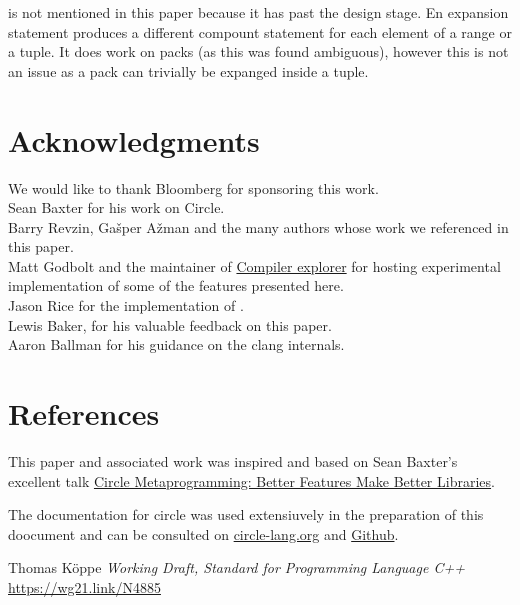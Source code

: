 \documentclass{wg21}
\begin{document}
 is not mentioned in this paper because it has past the design stage.
En expansion statement produces a different compount statement for each element of a range or a tuple.
It does work on packs (as this was found ambiguous), however this is not an issue as a pack can trivially be expanged inside a tuple.


\section{Acknowledgments}

We would like to thank Bloomberg for sponsoring this work.\\

Sean Baxter for his work on Circle.\\

Barry Revzin, Gašper Ažman and the many authors whose work we referenced in this paper.\\

Matt Godbolt and the maintainer of \href{compiler-explorer.com}{Compiler explorer} for hosting experimental implementation of some of the features presented here.\\

Jason Rice for the implementation of .\\

Lewis Baker, for his valuable feedback on this paper.\\

Aaron Ballman for his guidance on the clang internals.

\section{References}

This paper and associated work was inspired and based on Sean Baxter's excellent talk
\href{https://www.youtube.com/watch?v=15j4bkipuAg}{Circle Metaprogramming: Better Features Make Better Libraries}.

The documentation for circle was used extensiuvely in the preparation of this doocument and can be consulted on \href{https://www.circle-lang.org/}{circle-lang.org}
and \href{https://github.com/seanbaxter/circle}{Github}.

\vspace{20mm}

\renewcommand{\section}[2]{}%



\begin{thebibliography}{9}

Thomas Köppe
\emph{Working Draft, Standard for Programming Language C++}\newline
\url{https://wg21.link/N4885}


\end{thebibliography}
\end{document}
